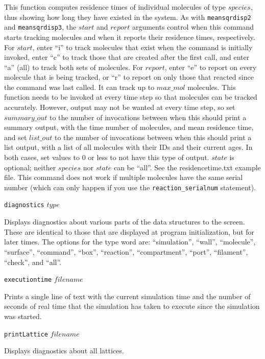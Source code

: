 \documentclass {scrbook}
\newcommand {\ttt} {\texttt}
\begin{document}
\begin{description}
This function computes residence times of individual molecules of type $species$, thus showing how long they have existed in the system. As with \ttt{meansqrdisp2} and \ttt{meansqrdisp3}, the $start$ and $report$ arguments control when this command starts tracking molecules and when it reports their residence times, respectively. For $start$, enter ``i'' to track molecules that exist when the command is initially invoked, enter ``c'' to track those that are created after the first call, and enter ``a'' (all) to track both sets of molecules. For $report$, enter ``e'' to report on every molecule that is being tracked, or ``r'' to report on only those that reacted since the command was last called. It can track up to $max\_mol$ molecules. This function needs to be invoked at every time step so that molecules can be tracked accurately. However, output may not be wanted at every time step, so set $summary\_out$ to the number of invocations between when this should print a summary output, with the time number of molecules, and mean residence time, and set $list\_out$ to the number of invocations between when this should print a list output, with a list of all molecules with their IDs and their current ages. In both cases, set values to 0 or less to not have this type of output. $state$ is optional; neither $species$ nor $state$ can be ``all''. See the residencetime.txt example file. This command does not work if multiple molecules have the same serial number (which can only happen if you use the \ttt{reaction\_serialnum} statement).

\item{\ttt{diagnostics} $type$}

Displays diagnostics about various parts of the data structures to the screen. These are identical to those that are displayed at program initialization, but for later times. The options for the type word are: ``simulation'', ``wall'', ``molecule'', ``surface'', ``command'', ``box'', ``reaction'', ``compartment'', ``port'', ``filament'', ``check'', and ``all''.

\item{\ttt{executiontime} $filename$}

Prints a single line of text with the current simulation time and the number of seconds of real time that the simulation has taken to execute since the simulation was started.

\item{\ttt{printLattice} $filename$}

Displays diagnostics about all lattices.


\end{description}
\end{document}
